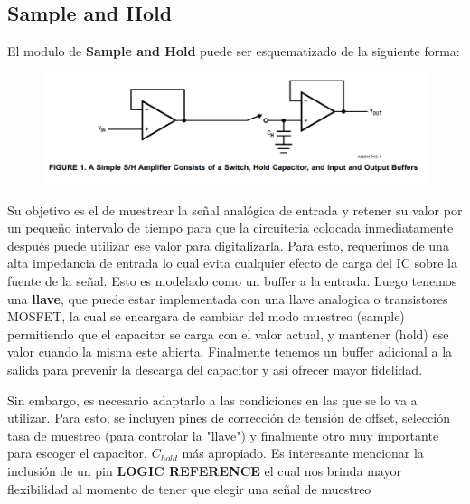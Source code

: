 


\subsection{Sample and Hold}

El modulo de \textbf{Sample and Hold}  puede ser esquematizado de la siguiente forma:

\begin{figure}[H]
	\centering
	\includegraphics[width=0.7\linewidth]{ImagenesEjercicio4/SyH}
	\caption{}
	\label{fig:syh}
\end{figure}
Su objetivo es el de muestrear la señal analógica de entrada y retener su valor por un pequeño intervalo de tiempo para que la circuiteria colocada inmediatamente después puede utilizar ese valor para digitalizarla.
Para esto, requerimos de una alta impedancia de entrada lo cual evita cualquier efecto de carga del IC sobre la fuente de la señal. Esto es modelado como un buffer a la entrada. Luego tenemos una \textbf{llave}, que puede estar implementada con una llave analogica o transistores MOSFET, la cual se encargara de cambiar del modo muestreo (sample) permitiendo que el capacitor se carga con el valor actual, y mantener (hold) ese valor cuando la misma este abierta. Finalmente tenemos un buffer adicional a la salida para prevenir la descarga del capacitor y así ofrecer mayor fidelidad. 


 Sin embargo, es necesario adaptarlo a las condiciones en las que se lo va a utilizar. Para esto, se incluyen pines de corrección de tensión de offset, selección tasa de muestreo (para controlar la "llave") y finalmente otro muy importante para escoger el capacitor, $C_{hold}$ más apropiado.
 Es interesante mencionar la inclusión de un pin \textbf{LOGIC REFERENCE} el cual nos brinda mayor flexibilidad al momento de tener que elegir una señal de muestreo
